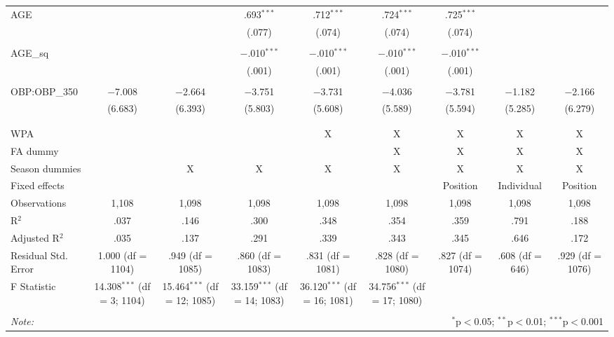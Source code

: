\begin{table}[H]
\begin{tabular}{@{\extracolsep{5pt}}lcccccccc}
 AGE &  &  & .693$^{***}$ & .712$^{***}$ & .724$^{***}$ & .725$^{***}$ &  &  \\
  &  &  & (.077) & (.074) & (.074) & (.074) &  &  \\
  & & & & & & & & \\
 AGE\_sq &  &  & $-$.010$^{***}$ & $-$.010$^{***}$ & $-$.010$^{***}$ & $-$.010$^{***}$ &  &  \\
  &  &  & (.001) & (.001) & (.001) & (.001) &  &  \\
  & & & & & & & & \\
 OBP:OBP\_350 & $-$7.008 & $-$2.664 & $-$3.751 & $-$3.731 & $-$4.036 & $-$3.781 & $-$1.182 & $-$2.166 \\
  & (6.683) & (6.393) & (5.803) & (5.608) & (5.589) & (5.594) & (5.285) & (6.279) \\
  & & & & & & & & \\
\hline \\[-1.8ex]
WPA &  &  &  & X & X & X & X & X \\
FA dummy &  &  &  &  & X & X & X & X \\
Season dummies &  & X & X & X & X & X & X & X \\
Fixed effects &  &  &  &  &  & Position & Individual & Position \\
Observations & 1,108 & 1,098 & 1,098 & 1,098 & 1,098 & 1,098 & 1,098 & 1,098 \\
R$^{2}$ & .037 & .146 & .300 & .348 & .354 & .359 & .791 & .188 \\
Adjusted R$^{2}$ & .035 & .137 & .291 & .339 & .343 & .345 & .646 & .172 \\
Residual Std. Error & 1.000 (df = 1104) & .949 (df = 1085) & .860 (df = 1083) & .831 (df = 1081) & .828 (df = 1080) & .827 (df = 1074) & .608 (df = 646) & .929 (df = 1076) \\
F Statistic & 14.308$^{***}$ (df = 3; 1104) & 15.464$^{***}$ (df = 12; 1085) & 33.159$^{***}$ (df = 14; 1083) & 36.120$^{***}$ (df = 16; 1081) & 34.756$^{***}$ (df = 17; 1080) &  &  &  \\
\hline
\hline \\[-1.8ex]
\textit{Note:}  & \multicolumn{8}{r}{$^{*}$p$<$0.05; $^{**}$p$<$0.01; $^{***}$p$<$0.001} \\
\end{tabular}
\end{table}
